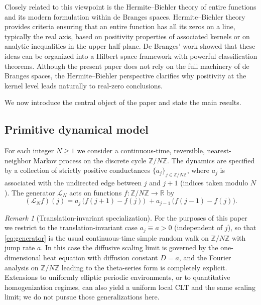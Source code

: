 \documentclass[12pt]{amsart}
\theoremstyle{definition}
\theoremstyle{remark}
\newtheorem{remark}[theorem]{Remark}
\newcommand{\Z}{\mathbb{Z}}
\newcommand{\R}{\mathbb{R}}
\begin{document}
Closely related to this viewpoint is the Hermite--Biehler theory\cite{Krein1947,deBranges1968} of entire functions and its modern formulation within de Branges spaces\cite{deBranges1968}. Hermite--Biehler theory provides criteria ensuring that an entire function has all its zeros on a line, typically the real axis, based on positivity properties of associated kernels or on analytic inequalities in the upper half-plane. De Branges' work showed that these ideas can be organized into a Hilbert space framework with powerful classification theorems. Although the present paper does not rely on the full machinery of de Branges spaces\cite{deBranges1968}, the Hermite--Biehler perspective clarifies why positivity at the kernel level leads naturally to real-zero conclusions.

We now introduce the central object of the paper and state the main results.

\subsection{Primitive dynamical model}
\label{sec:model}

For each integer $N\ge 1$ we consider a continuous-time, reversible, nearest-neighbor Markov process on the discrete cycle $\Z/N\Z$. The dynamics are specified by a collection of strictly positive conductances $\{a_j\}_{j\in\Z/N\Z}$, where $a_j$ is associated with the undirected edge between $j$ and $j+1$ (indices taken modulo $N$). The generator $\mathcal{L}_N$ acts on functions $f:\Z/N\Z\to\R$ by
\begin{equation}
\label{eq:generator}
(\mathcal{L}_N f)(j)
=
a_j\,\bigl(f(j+1)-f(j)\bigr)
\;+
a_{j-1}\,\bigl(f(j-1)-f(j)\bigr).
\end{equation}

\begin{remark}[Translation-invariant specialization]
\label{rem:translation-invariant}
For the purposes of this paper we restrict to the translation-invariant case
\(
a_j\equiv a>0
\)
(independent of $j$), so that \eqref{eq:generator} is the usual continuous-time simple
random walk on $\Z/N\Z$ with jump rate $a$. In this case the diffusive scaling limit is
governed by the one-dimensional heat equation with diffusion constant \(D=a\), and the
Fourier analysis on $\Z/N\Z$ leading to the theta-series form is completely explicit.
Extensions to uniformly elliptic periodic environments, or to quantitative homogenization
regimes, can also yield a uniform local CLT and the same scaling limit; we do not pursue
those generalizations here.
\end{remark}
\end{document}
